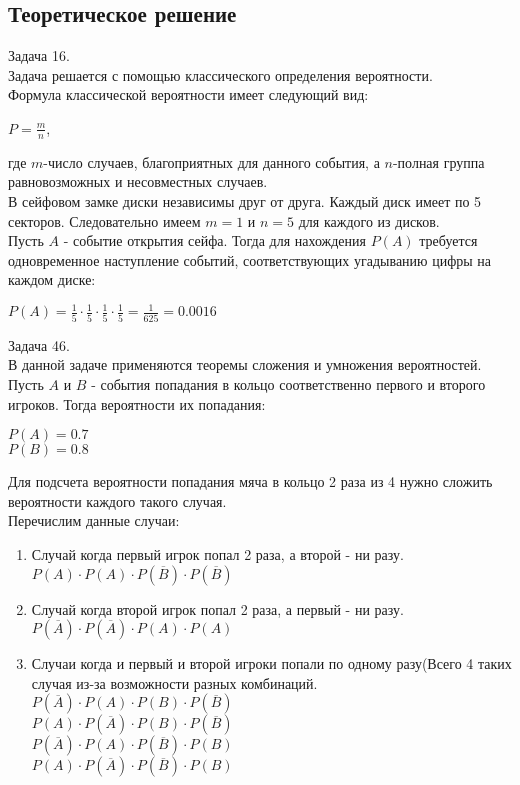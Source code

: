 \subsection{Теоретическое решение}
Задача 16.\\
Задача решается с помощью классического определения вероятности.\\
Формула классической вероятности имеет следующий вид:\\
\begin{center}
$P=\frac{m}{n}$,\\
\end{center}
где $m$-число случаев, благоприятных для данного
события, а $n$-полная группа равновозможных и несовместных случаев.\\
В сейфовом замке диски независимы друг от друга. Каждый диск имеет по 5 секторов. Следовательно имеем $m=1$ и $n=5$ для каждого из дисков.\\
Пусть $A$ - событие открытия сейфа. Тогда для нахождения $P(A)$ требуется одновременное наступление событий, соответствующих угадыванию цифры на каждом диске:\\
\begin{center}
$P(A)=\frac{1}{5}\cdot\frac{1}{5}\cdot\frac{1}{5}\cdot\frac{1}{5}=\frac{1}{625}=0.0016$\\
\end{center}
Задача 46.\\
В данной задаче применяются теоремы сложения и умножения вероятностей.\\
Пусть $A$ и $B$ - события попадания в кольцо соответственно первого и второго игроков. Тогда вероятности их попадания:
\begin{center}
$P(A)=0.7$\\
$P(B)=0.8$\\
\end{center}
Для подсчета вероятности попадания мяча в кольцо 2 раза из 4 нужно сложить вероятности каждого такого случая.\\
Перечислим данные случаи:
\begin{enumerate}
\item Случай когда первый игрок попал 2 раза, а второй - ни разу. \\$P(A)\cdot P(A)\cdot P(\overline{B})\cdot P(\overline{B})$\\
\item Случай когда второй игрок попал 2 раза, а первый - ни разу. \\$ P(\overline{A})\cdot P(\overline{A})\cdot P(A)\cdot P(A)$\\
\item Случаи когда и первый и второй игроки попали по одному разу(Всего 4 таких случая из-за возможности разных комбинаций.\\
$ P(\overline{A})\cdot P(A)\cdot P(B)\cdot P(\overline{B})$\\
$ P(A)\cdot P(\overline{A})\cdot P(B)\cdot P(\overline{B})$\\
$ P(\overline{A})\cdot P(A)\cdot P(\overline{B})\cdot P(B)$\\
$ P(A)\cdot P(\overline{A})\cdot P(\overline{B})\cdot P(B)$\\
\end{enumerate}
